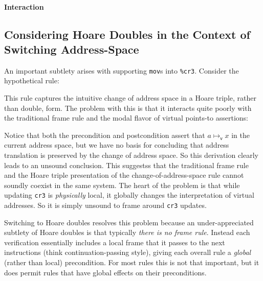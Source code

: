 \paragraph{Interaction}
\label{sec:interaction}
\subsection{Considering Hoare Doubles in the Context of Switching Address-Space}
An important subtlety arises with supporting \lstinline|mov|s into \lstinline|%cr3|. Consider the hypothetical rule:
\begin{mathpar}
\end{mathpar}
This rule captures the intuitive change of address space in a Hoare triple, rather than double, form. The problem with this is that it interacts quite poorly with the traditional frame rule and the modal flavor of virtual points-to assertions:
\begin{mathpar}
\end{mathpar}
Notice that both the precondition and postcondition assert that $a\mapsto_\mathsf{v} x$ in the current address space, but we have no basis for concluding that address translation is preserved by the change of address space. So this derivation clearly leads to an unsound conclusion. This suggestss that the traditional frame rule and the Hoare triple presentation of the change-of-address-space rule cannot soundly coexist in the same system.
The heart of the problem is that while updating \lstinline|cr3| is \emph{physically} local, it globally changes the interpretation of virtual addresses. So it is simply unsound to frame around \lstinline|cr3| updates.

Switching to Hoare doubles resolves this problem because an under-appreciated subtlety of Hoare doubles is that typically \emph{there is no frame rule}. Instead each verification essentially includes a local frame that it passes to the next instructions (think continuation-passing style), giving each overall rule a \emph{global} (rather than local) precondition. For most rules this is not that important, but it does permit rules that have global effects on their preconditions.

